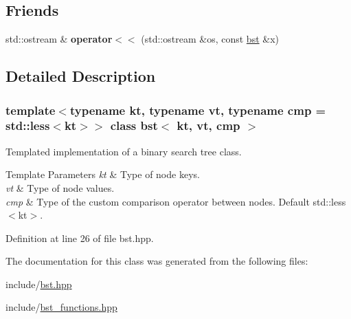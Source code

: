 \subsection*{Friends}
\begin{DoxyCompactItemize}
\item 
\mbox{\label{classbst_ae4b7d69364fca0855f74abdcad674ebf}} 
std\+::ostream \& {\bfseries operator$<$$<$} (std\+::ostream \&os, const \hyperlink{classbst}{bst} \&x)
\end{DoxyCompactItemize}


\subsection{Detailed Description}
\subsubsection*{template$<$typename kt, typename vt, typename cmp = std\+::less$<$kt$>$$>$\newline
class bst$<$ kt, vt, cmp $>$}

Templated implementation of a binary search tree class. 


\begin{DoxyTemplParams}{Template Parameters}
{\em kt} & Type of node keys. \\
\hline
{\em vt} & Type of node values. \\
\hline
{\em cmp} & Type of the custom comparison operator between nodes. Default std\+::less$<$kt$>$. \\
\hline
\end{DoxyTemplParams}


Definition at line 26 of file bst.\+hpp.



The documentation for this class was generated from the following files\+:\begin{DoxyCompactItemize}
\item 
include/\hyperlink{bst_8hpp}{bst.\+hpp}\item 
include/\hyperlink{bst__functions_8hpp}{bst\+\_\+functions.\+hpp}\end{DoxyCompactItemize}

